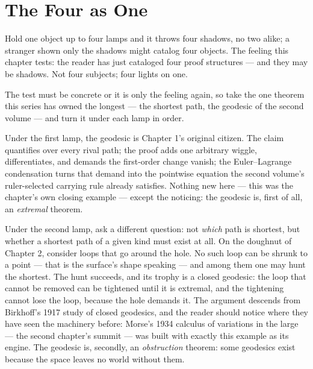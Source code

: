 \chapter{The Four as One}

\begin{intuition}
Hold one object up to four lamps and it throws four shadows, no two
alike; a stranger shown only the shadows might catalog four objects. The
feeling this chapter tests: the reader has just cataloged four proof
structures --- and they may be shadows. Not four subjects; four lights
on one.
\end{intuition}

The test must be concrete or it is only the feeling again, so take the
one theorem this series has owned the longest --- the shortest path, the
geodesic of the second volume --- and turn it under each lamp in order.

Under the first lamp, the geodesic is Chapter 1's original citizen. The
claim quantifies over every rival path; the proof adds one arbitrary
wiggle, differentiates, and demands the first-order change vanish; the
Euler--Lagrange condensation turns that demand into the pointwise
equation the second volume's ruler-selected carrying rule already
satisfies. Nothing new here --- this was the chapter's own closing
example --- except the noticing: the geodesic is, first of all, an
\emph{extremal} theorem.

Under the second lamp, ask a different question: not \emph{which} path
is shortest, but whether a shortest path of a given kind must exist at
all. On the doughnut of Chapter 2, consider loops that go around the
hole. No such loop can be shrunk to a point --- that is the surface's
shape speaking --- and among them one may hunt the shortest. The hunt
succeeds, and its trophy is a closed geodesic: the loop that cannot be
removed can be tightened until it is extremal, and the tightening cannot
lose the loop, because the hole demands it. The argument descends from
Birkhoff's 1917 study of closed geodesics, and the reader should notice
where they have seen the machinery before: Morse's 1934 calculus of
variations in the large --- the second chapter's summit --- was built
with exactly this example as its engine. The geodesic is, secondly, an
\emph{obstruction} theorem: some geodesics exist because the space
leaves no world without them.

